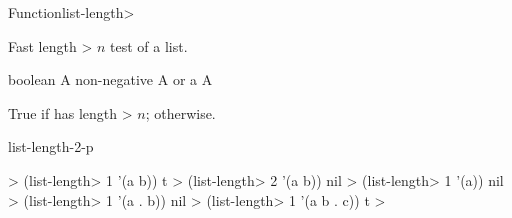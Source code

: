 \documentclass[10pt,twoside,english,pdftex]{article}
\begin{document}

\begin{functiondoc}{Function}{list-length>}%
  {
    \returns{} }
%
%

\fnsyntax

\fnpurpose Fast length > $n$ test of a list.

\fnpackage {}

\fnmodule {}

\fnargs
\begin{args}{boolean}
\arg[n] A non-negative 
\arg[list] A  or a 
\arg[boolean] A 
\end{args}

\fnreturns True if  has length > $n$; \nil{} otherwise.

\begin{alsos}{list-length-2-p}
\end{alsos}

\fnexamples
%
\W\supp
\begin{example}
  > (list-length> 1 '(a b))
  t
  > (list-length> 2 '(a b))
  nil
  > (list-length> 1 '(a))
  nil\goodpagebreak
  > (list-length> 1 '(a . b))
  nil
  > (list-length> 1 '(a b . c))
  t
  >
\end{example}

\end{functiondoc}

\end{document}
